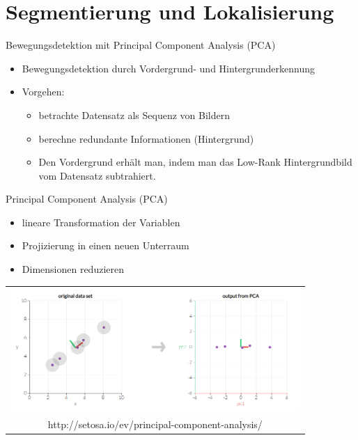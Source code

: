 \section{Segmentierung und Lokalisierung}
\begin{frame}[t,fragile]{Bewegungsdetektion mit Principal Component Analysis (PCA) }
	\begin{itemize}
  \item Bewegungsdetektion durch Vordergrund- und Hintergrunderkennung

  \item{Vorgehen:}
      \begin{itemize}
        \item{betrachte Datensatz als Sequenz von Bildern}
        \item{berechne redundante Informationen (Hintergrund)}
        \item{Den Vordergrund erhält man, indem man das Low-Rank Hintergrundbild vom Datensatz subtrahiert.}
      \end{itemize}

  \end{itemize}
\end{frame}

\begin{frame}[t,fragile]{Principal Component Analysis (PCA) }
      \begin{itemize}
        \item{lineare Transformation der Variablen}
        \item{Projizierung in einen neuen Unterraum}
        \item{Dimensionen reduzieren}
      
      \end{itemize}
       
  \vspace{0.01em}
  {
\begin{table}
\centering
        \begin{tabular}{c}
        \includegraphics[width=11cm]{images/Segmentierung/PCA}\\
      \tiny{http://setosa.io/ev/principal-component-analysis/}
         \end{tabular}
        
\end{table}
 }
\end{frame}



